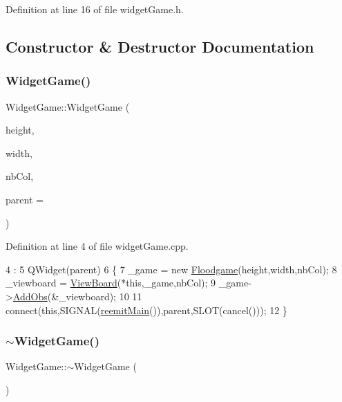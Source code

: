 Definition at line 16 of file widget\+Game.\+h.



\subsection{Constructor \& Destructor Documentation}
\hypertarget{class_widget_game_a0c95303c9fc87b64d5fd3cd4f4fb5844}{}\label{class_widget_game_a0c95303c9fc87b64d5fd3cd4f4fb5844} 
\subsubsection{\texorpdfstring{Widget\+Game()}{WidgetGame()}}
{\footnotesize\ttfamily Widget\+Game\+::\+Widget\+Game (\begin{DoxyParamCaption}\item[{int}]{height,  }\item[{int}]{width,  }\item[{int}]{nb\+Col,  }\item[{Q\+Widget $\ast$}]{parent = {} }\end{DoxyParamCaption})\hspace{0.3cm}{\ttfamily [explicit]}}



Definition at line 4 of file widget\+Game.\+cpp.


\begin{DoxyCode}
4                                                                      :
5     QWidget(parent)
6 \{
7     \_game = \textcolor{keyword}{new} \hyperlink{classoli_1_1_floodgame}{Floodgame}(height,width,nbCol);
8     \_viewboard = \hyperlink{classoli_1_1_view_board}{ViewBoard}(*\textcolor{keyword}{this},\_game,nbCol);
9     \_game->\hyperlink{classoli_1_1_observable_af746a8f49e2b08bc93767281dd813532}{AddObs}(&\_viewboard);
10 
11     connect(\textcolor{keyword}{this},SIGNAL(\hyperlink{class_widget_game_a39c76aac5eff9242d2253017c1209027}{reemitMain}()),parent,SLOT(cancel()));
12 \}
\end{DoxyCode}
\hypertarget{class_widget_game_a5164870bf08c80da133fc075298347cc}{}\label{class_widget_game_a5164870bf08c80da133fc075298347cc} 
\subsubsection{\texorpdfstring{$\sim$\+Widget\+Game()}{~WidgetGame()}}
{\footnotesize\ttfamily Widget\+Game\+::$\sim$\+Widget\+Game (\begin{DoxyParamCaption}{ }\end{DoxyParamCaption})}



